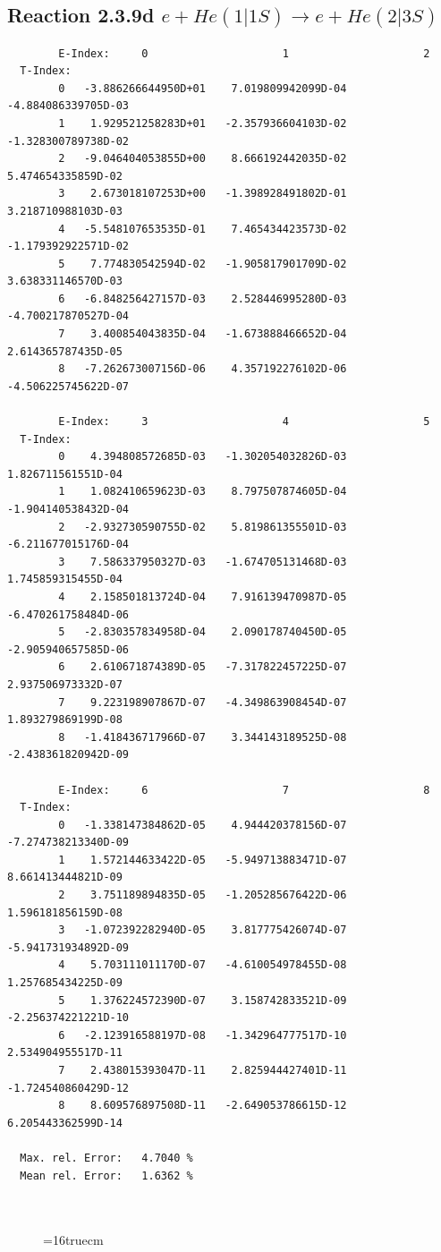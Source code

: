 \documentclass[12pt,dvips]{article}
\begin{document}
\subsection{
Reaction 2.3.9d $ e + He(1|1S) \rightarrow e + He(2|3S) $
}




\begin{small}\begin{verbatim}
        E-Index:     0                     1                     2
  T-Index:
        0   -3.886266644950D+01    7.019809942099D-04   -4.884086339705D-03
        1    1.929521258283D+01   -2.357936604103D-02   -1.328300789738D-02
        2   -9.046404053855D+00    8.666192442035D-02    5.474654335859D-02
        3    2.673018107253D+00   -1.398928491802D-01    3.218710988103D-03
        4   -5.548107653535D-01    7.465434423573D-02   -1.179392922571D-02
        5    7.774830542594D-02   -1.905817901709D-02    3.638331146570D-03
        6   -6.848256427157D-03    2.528446995280D-03   -4.700217870527D-04
        7    3.400854043835D-04   -1.673888466652D-04    2.614365787435D-05
        8   -7.262673007156D-06    4.357192276102D-06   -4.506225745622D-07

        E-Index:     3                     4                     5
  T-Index:
        0    4.394808572685D-03   -1.302054032826D-03    1.826711561551D-04
        1    1.082410659623D-03    8.797507874605D-04   -1.904140538432D-04
        2   -2.932730590755D-02    5.819861355501D-03   -6.211677015176D-04
        3    7.586337950327D-03   -1.674705131468D-03    1.745859315455D-04
        4    2.158501813724D-04    7.916139470987D-05   -6.470261758484D-06
        5   -2.830357834958D-04    2.090178740450D-05   -2.905940657585D-06
        6    2.610671874389D-05   -7.317822457225D-07    2.937506973332D-07
        7    9.223198907867D-07   -4.349863908454D-07    1.893279869199D-08
        8   -1.418436717966D-07    3.344143189525D-08   -2.438361820942D-09

        E-Index:     6                     7                     8
  T-Index:
        0   -1.338147384862D-05    4.944420378156D-07   -7.274738213340D-09
        1    1.572144633422D-05   -5.949713883471D-07    8.661413444821D-09
        2    3.751189894835D-05   -1.205285676422D-06    1.596181856159D-08
        3   -1.072392282940D-05    3.817775426074D-07   -5.941731934892D-09
        4    5.703111011170D-07   -4.610054978455D-08    1.257685434225D-09
        5    1.376224572390D-07    3.158742833521D-09   -2.256374221221D-10
        6   -2.123916588197D-08   -1.342964777517D-10    2.534904955517D-11
        7    2.438015393047D-11    2.825944427401D-11   -1.724540860429D-12
        8    8.609576897508D-11   -2.649053786615D-12    6.205443362599D-14

  Max. rel. Error:   4.7040 %
  Mean rel. Error:   1.6362 %



\end{verbatim}\end{small}
\begin{figure} \label{2.3.9d}
\epsfxsize=16truecm
\end{figure}
\newpage
\end{document}
